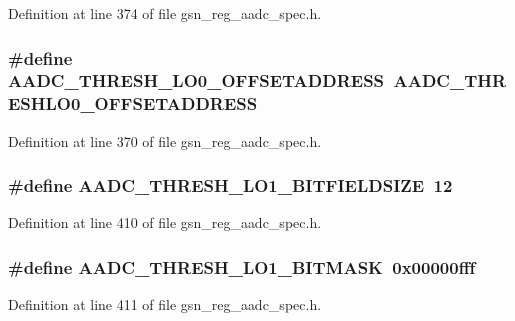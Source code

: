 Definition at line 374 of file gsn\_\-reg\_\-aadc\_\-spec.h.

\hypertarget{a00543_acc03f62a4c8ec3832a20fb9b56865b92}{
\subsubsection[{AADC\_\-THRESH\_\-LO0\_\-OFFSETADDRESS}]{\setlength{\rightskip}{0pt plus 5cm}\#define AADC\_\-THRESH\_\-LO0\_\-OFFSETADDRESS~AADC\_\-THRESHLO0\_\-OFFSETADDRESS}}
\label{a00543_acc03f62a4c8ec3832a20fb9b56865b92}


Definition at line 370 of file gsn\_\-reg\_\-aadc\_\-spec.h.

\hypertarget{a00543_abe8703e96f981ef21b521812c7948528}{
\subsubsection[{AADC\_\-THRESH\_\-LO1\_\-BITFIELDSIZE}]{\setlength{\rightskip}{0pt plus 5cm}\#define AADC\_\-THRESH\_\-LO1\_\-BITFIELDSIZE~12}}
\label{a00543_abe8703e96f981ef21b521812c7948528}


Definition at line 410 of file gsn\_\-reg\_\-aadc\_\-spec.h.

\hypertarget{a00543_a9a687ae4109f8657984cb12970ce0dfd}{
\subsubsection[{AADC\_\-THRESH\_\-LO1\_\-BITMASK}]{\setlength{\rightskip}{0pt plus 5cm}\#define AADC\_\-THRESH\_\-LO1\_\-BITMASK~0x00000fff}}
\label{a00543_a9a687ae4109f8657984cb12970ce0dfd}


Definition at line 411 of file gsn\_\-reg\_\-aadc\_\-spec.h.

